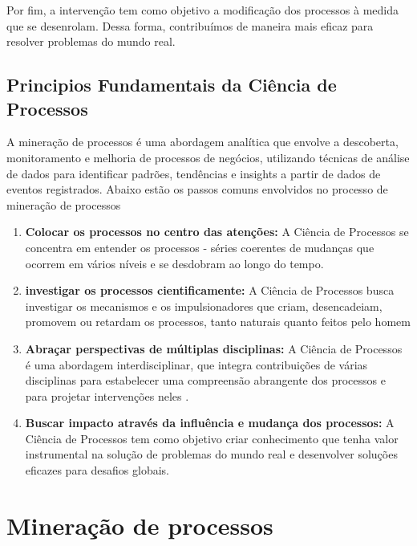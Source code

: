\documentclass[tcc2]{classe_uftex/uftex}
\begin{document}
Por fim, a intervenção tem como objetivo a modificação dos processos à medida que se desenrolam. Dessa forma, contribuímos de maneira mais eficaz para resolver problemas do mundo real.\cite{gaieck2020science}


\subsection{Principios Fundamentais da Ciência de Processos}

A mineração de processos é uma abordagem analítica que envolve a descoberta, monitoramento e melhoria de processos de negócios, utilizando técnicas de análise de dados para identificar padrões, tendências e insights a partir de dados de eventos registrados. Abaixo estão os passos comuns envolvidos no processo de mineração de processos


\begin{enumerate}
    \item \textbf{Colocar os processos no centro das atenções:}
    A Ciência de Processos se concentra em entender os processos - séries coerentes de mudanças que ocorrem em vários níveis e se desdobram ao longo do tempo. \cite{davenport2019process}


 \item \textbf{investigar os processos cientificamente:}
    A Ciência de Processos busca investigar os mecanismos e os impulsionadores que criam, desencadeiam, promovem ou retardam os processos, tanto naturais quanto feitos pelo homem\cite{davenport2019process}
    
    \item \textbf{Abraçar perspectivas de múltiplas disciplinas:}
  A Ciência de Processos é uma abordagem interdisciplinar, que integra contribuições de várias disciplinas para estabelecer uma compreensão abrangente dos processos e para projetar intervenções neles .\cite{davenport2019process}

    \item \textbf{Buscar impacto através da influência e mudança dos processos:}
   A Ciência de Processos tem como objetivo criar conhecimento que tenha valor instrumental na solução de problemas do mundo real e desenvolver soluções eficazes para desafios globais.\cite{davenport2019process}


\end{enumerate}

\section{Mineração de processos}
\end{document}
